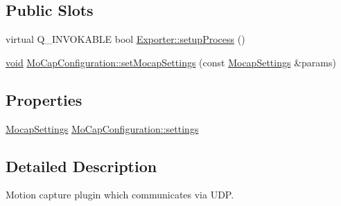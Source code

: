 \subsection*{\-Public \-Slots}
\begin{DoxyCompactItemize}
\item 
virtual \-Q\-\_\-\-I\-N\-V\-O\-K\-A\-B\-L\-E bool \hyperlink{group___mo_cap_plugin_gad43c05ef37398dad0c09a5103beb27d8}{\-Exporter\-::setup\-Process} ()
\item 
\hyperlink{group___u_a_v_objects_plugin_ga444cf2ff3f0ecbe028adce838d373f5c}{void} \hyperlink{group___mo_cap_plugin_ga1c9c0bbef4c538125abfd27b6fc47208}{\-Mo\-Cap\-Configuration\-::set\-Mocap\-Settings} (const \hyperlink{group___mo_cap_plugin_ga6083347a5b3eb70e360f599354dc0f0b}{\-Mocap\-Settings} \&params)
\end{DoxyCompactItemize}
\subsection*{\-Properties}
\begin{DoxyCompactItemize}
\item 
\hyperlink{group___mo_cap_plugin_ga6083347a5b3eb70e360f599354dc0f0b}{\-Mocap\-Settings} \hyperlink{group___mo_cap_plugin_ga7211120cc5d6c7feffb594a36552a9af}{\-Mo\-Cap\-Configuration\-::settings}
\end{DoxyCompactItemize}


\subsection{\-Detailed \-Description}
\-Motion capture plugin which communicates via \-U\-D\-P. 

